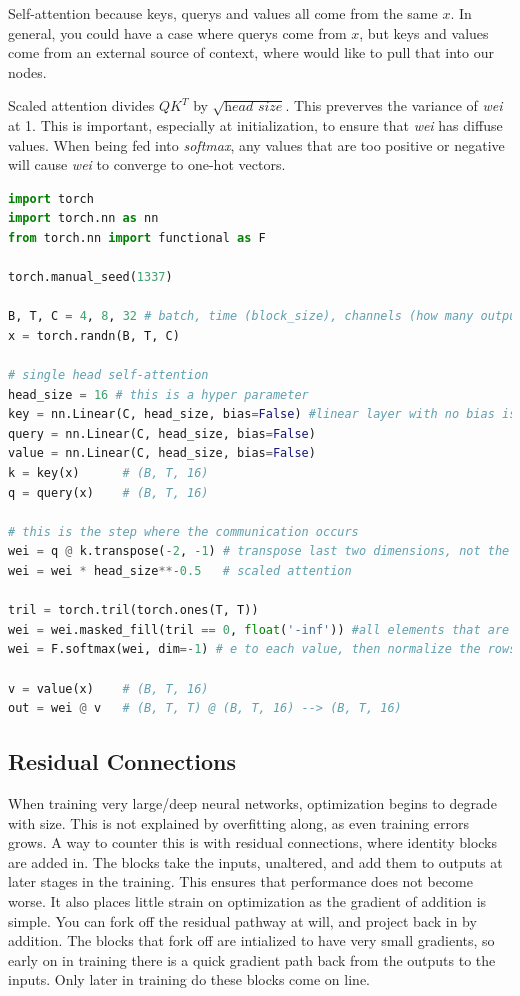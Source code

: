 \documentclass{article}
\begin{document}
Self-attention because keys, querys and values all come from the same $x$. In general, you could have a case where querys come from $x$, but keys and values come from an external source of context, where would like to pull that into our nodes.

Scaled attention divides $QK^T$ by $\sqrt{\textit{head size}}$. This preverves the variance of \emph{wei} at 1. 
This is important, especially at initialization, to ensure that \emph{wei} has diffuse values.  
When being fed into \emph{softmax}, any values that are too positive or negative will cause \emph{wei} to converge to one-hot vectors.
\begin{lstlisting}[language=Python]
import torch
import torch.nn as nn
from torch.nn import functional as F

torch.manual_seed(1337)

B, T, C = 4, 8, 32 # batch, time (block_size), channels (how many outputs)
x = torch.randn(B, T, C)

# single head self-attention
head_size = 16 # this is a hyper parameter
key = nn.Linear(C, head_size, bias=False) #linear layer with no bias is a matrix multiply with fixed weights
query = nn.Linear(C, head_size, bias=False)
value = nn.Linear(C, head_size, bias=False)
k = key(x)      # (B, T, 16)
q = query(x)    # (B, T, 16)

# this is the step where the communication occurs
wei = q @ k.transpose(-2, -1) # transpose last two dimensions, not the first (B, T, 16) @ (B, 16, T) --> (B, T, T)
wei = wei * head_size**-0.5   # scaled attention

tril = torch.tril(torch.ones(T, T))
wei = wei.masked_fill(tril == 0, float('-inf')) #all elements that are zero in tril (lower triangular) become -infinity
wei = F.softmax(wei, dim=-1) # e to each value, then normalize the rows to sum to 1

v = value(x)    # (B, T, 16)
out = wei @ v   # (B, T, T) @ (B, T, 16) --> (B, T, 16)
\end{lstlisting}

\subsection*{Residual Connections}
When training very large/deep neural networks, optimization begins to degrade with size.
This is not explained by overfitting along, as even training errors grows.
A way to counter this is with residual connections, where identity blocks are added in.
The blocks take the inputs, unaltered, and add them to outputs at later stages in the training.  
This ensures that performance does not become worse.
It also places little strain on optimization as the gradient of addition is simple.
You can fork off the residual pathway at will, and project back in by addition.
The blocks that fork off are intialized to have very small gradients, so early on in training there is a quick gradient path back from the outputs to the inputs.
Only later in training do these blocks come on line.
\end{document}
